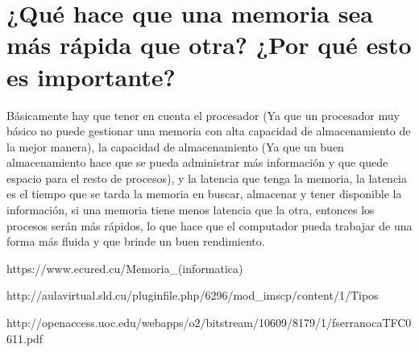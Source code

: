 ﻿\documentclass{article}
\begin{document}
\section{¿Qué hace que una memoria sea más rápida que otra? ¿Por qué esto es importante?} \label{contenido}
Básicamente hay que tener en cuenta el procesador (Ya que un procesador muy básico no puede gestionar una memoria con alta capacidad de almacenamiento de la mejor manera), la capacidad de almacenamiento (Ya que un buen almacenamiento hace que se pueda administrar más información y que quede espacio para el resto de procesos), y la latencia que tenga la memoria, la latencia es el tiempo que se tarda la memoria en buscar, almacenar y tener disponible la información, si una memoria tiene menos latencia que la otra, entonces los procesos serán más rápidos, lo que hace que el computador pueda trabajar de una forma más fluida y que brinde un buen rendimiento.





https://www.ecured.cu/Memoria_(informatica)

http://aulavirtual.sld.cu/pluginfile.php/6296/mod_imscp/content/1/Tipos%

http://openaccess.uoc.edu/webapps/o2/bitstream/10609/8179/1/fserranocaTFC0611.pdf
\end{document}
